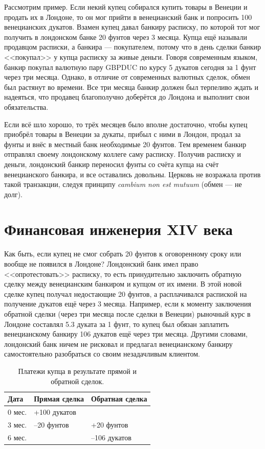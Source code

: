 \documentclass[a4paper,14pt]{extarticle}
\newcommand{\foreign}[1]{\textit{#1}}
\begin{document}
Рассмотрим пример. Если некий купец собирался купить товары в Венеции и продать их в Лондоне, то он мог прийти в венецианский банк и попросить 100 венецианских дукатов. Взамен купец давал банкиру расписку, по которой тот мог получить в лондонском банке 20 фунтов через 3 месяца. Купца ещё называли продавцом расписки, а банкира --- покупателем, потому что в день сделки банкир <<покупал>> у купца расписку за живые деньги. Говоря современным языком, банкир покупал валютную пару GBPDUC по курсу 5 дукатов сегодня за 1 фунт через три месяца. Однако, в отличие от современных валютных сделок, обмен был растянут во времени. Все три месяца банкир должен был терпеливо ждать и надеяться, что продавец благополучно доберётся до Лондона и выполнит свои обязательства.

Если всё шло хорошо, то трёх месяцев было вполне достаточно, чтобы купец приобрёл товары в Венеции за дукаты, прибыл с ними в Лондон, продал за фунты и внёс в местный банк необходимые 20 фунтов. Тем временем банкир отправлял своему лондонскому коллеге саму расписку. Получив расписку и деньги, лондонский банкир переносил фунты со счёта купца на счёт венецианского банкира, и все оставались довольны. Церковь не возражала против такой транзакции, следуя принципу \foreign{cambium non est mutuum} (обмен --- не долг).

\section*{Финансовая инженерия XIV века}
Как быть, если купец не смог собрать 20 фунтов к оговоренному сроку или вообще не появился в Лондоне? Лондонский банк имел право <<опротестовать>> расписку, то есть принудительно заключить обратную сделку между венецианским банкиром и купцом от их имени. В этой новой сделке купец получал недостающие 20 фунтов, а расплачивался распиской на получение дукатов ещё через 3 месяца. Например, если к моменту заключения обратной сделки (через три месяца после сделки в Венеции) рыночный курс в Лондоне составлял \num{5.3} дуката за 1 фунт, то купец был обязан заплатить венецианскому банкиру 106 дукатов ещё через три месяца. Другими словами, лондонский банк ничем не рисковал и предлагал венецианскому банкиру самостоятельно разобраться со своим незадачливым клиентом.
\begin{table}[h]
\centering
\begin{tabular}{l|l|l}
Дата & Прямая сделка & Обратная сделка \\ \hline
0 мес. & +100 дукатов & \\
3 мес. & --20 фунтов & +20 фунтов \\
6 мес. & & --106 дукатов
\end{tabular}
\captionsetup{labelformat=empty}
\caption{Платежи купца в результате прямой и обратной сделок.}
\end{table}
\end{document}
